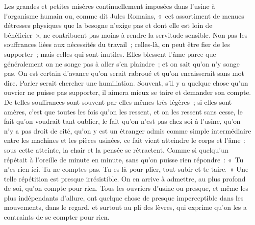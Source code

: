 \documentclass[french,twoside]{book} %
\begin{document}
Les grandes et petites misères continuellement imposées dans l'usine à l'organisme humain ou, comme dit Jules Romains, « cet assortiment de menues détresses physiques que la besogne n'exige pas et dont elle est loin de bénéficier », ne contribuent pas moins à rendre la servitude sensible. Non pas les souffrances liées aux nécessités du travail ; celles-là, on peut être fier de les supporter ; mais celles qui sont inutiles. Elles blessent l'âme parce que généralement on ne songe pas à aller s'en plaindre ; et on sait qu'on n'y songe pas. On est certain d'avance qu'on serait rabroué et qu'on encaisserait sans mot dire. Parler serait chercher une humiliation. Souvent, s'il y a quelque chose qu'un ouvrier ne puisse pas supporter, il aimera mieux se taire et demander son compte. De telles souffrances sont souvent par elles-mêmes très légères ; si elles sont amères, c'est que toutes les fois qu'on les ressent, et on les ressent sans cesse, le fait qu'on voudrait tant oublier, le fait qu'on n'est pas chez soi à l'usine, qu'on n'y a pas droit de cité, qu'on y est un étranger admis comme simple intermédiaire entre les machines et les pièces usinées, ce fait vient atteindre le corps et l'âme ; sous cette atteinte, la chair et la pensée se rétractent. Comme si quelqu'un répétait à l'oreille de minute en minute, sans qu'on puisse rien répondre : « Tu n'es rien ici. Tu ne comptes pas. Tu es là pour plier, tout subir et te taire. » Une telle répétition est presque irrésistible. On en arrive à admettre, au plus profond de soi, qu'on compte pour rien. Tous les ouvriers d'usine ou presque, et même les plus indépendants d'allure, ont quelque chose de presque imperceptible dans les mouvements, dans le regard, et surtout au pli des lèvres, qui exprime qu'on les a contraints de se compter pour rien.\par
\end{document}
